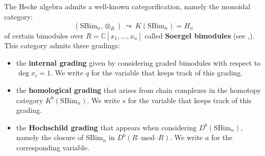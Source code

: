\documentclass[12pt]{amsart}
\numberwithin{equation}{section}
\theoremstyle{definition}
\theoremstyle{remark}
\newcommand{\CC}{\mathbb{C}}
\renewcommand{\1}{\mathbf{1}}
\newcommand{\SBim}{\mathrm{SBim}}
\begin{document}
\subsection{}
\label{sub:intro categorification}

The Hecke algebra admits a well-known categorification, namely the monoidal category:
$$
(\SBim_n, \otimes_R) \ \leadsto \ K(\SBim_n) = H_n
$$
of certain bimodules over $R = \CC[x_1,...,x_n]$ called \textbf{Soergel bimodules} (see \cite{Soergel},\cite{Rou}). This category admits three gradings:

\begin{itemize}

\item the {\bf internal grading} given by considering graded bimodules with respect to $\deg x_i = 1$. We write $q$ for the variable that keeps track of this grading.

\item the {\bf homological grading} that arises from chain complexes in the homotopy category $K^b(\SBim_n)$. We write $s$ for the variable that keeps track of this grading.

\item the {\bf Hochschild grading} that appears when considering $D^b(\SBim_n)$, namely the closure of $\SBim_n$ in $D^b(R\text{--mod--}R)$. We write $a$ for the corresponding variable. 

\end{itemize}
\end{document}
